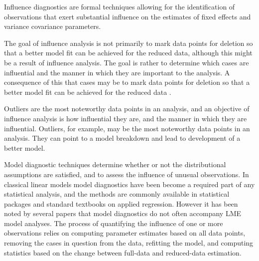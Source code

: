 \documentclass[12pt, a4paper]{report}
\theoremstyle{plain}
\theoremstyle{definition}
\theoremstyle{remark}
\begin{document}
Influence diagnostics are formal techniques allowing for the identification of observations that exert substantial 
influence on the estimates of fixed effects and variance covariance parameters. 

 



The goal of influence analysis is not primarily to mark data
points for deletion so that a better model fit can be achieved for the reduced data, although this might be a
result of influence analysis. The goal is rather to determine which cases are influential and the manner in
which they are important to the analysis. A consequence of this that cases may be to mark data points for deletion so that a better model fit can be achieved for the reduced data \citep{schabenberger}.


Outliers are the most noteworthy data points in an analysis, and an objective of influence analysis is how influential they are,
and the manner in which they are influential. Outliers, for example, may be the most noteworthy data points in
an analysis. They can point to a model breakdown and lead to development of a better model.







 

Model diagnostic techniques determine whether or not the distributional assumptions are satisfied, and to assess the influence of unusual observations. In classical linear models model diagnostics have been become a required part of any statistical analysis, and the methods are commonly available in statistical packages and standard textbooks on applied regression. However it has been noted by several papers that model diagnostics do not often accompany LME model analyses.
The process of quantifying the influence of one or more observations relies on computing parameter estimates based on all data points, removing the cases in question from the data, refitting the model, and computing statistics based on the change between full-data and reduced-data estimation.

\end{document}
